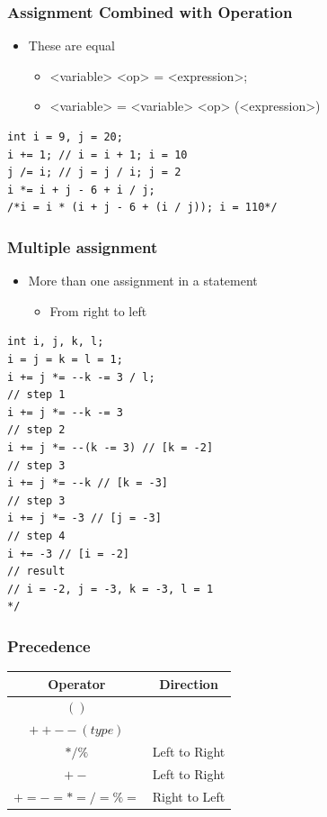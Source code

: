 \documentclass{../c-lecture}
\begin{document}
\begin{frame}[fragile]
  \frametitle{Assignment Combined with Operation}
  \begin{itemize}
    \item These are equal
    \begin{itemize}
      \item <variable> <op> = <expression>;
      \item
        <variable> = <variable> <op> (<expression>)
    \end{itemize}
  \end{itemize}
  \begin{verbatim}
int i = 9, j = 20;
i += 1; // i = i + 1; i = 10
j /= i; // j = j / i; j = 2
i *= i + j - 6 + i / j;
/*i = i * (i + j - 6 + (i / j)); i = 110*/
  \end{verbatim}
\end{frame}

\begin{frame}[fragile]
  \frametitle{Multiple assignment}
  \begin{itemize}
    \item More than one assignment in a statement
    \begin{itemize}
      \item From right to left
    \end{itemize}
  \end{itemize}
  \begin{verbatim}
int i, j, k, l;
i = j = k = l = 1;
i += j *= --k -= 3 / l;
// step 1
i += j *= --k -= 3
// step 2
i += j *= --(k -= 3) // [k = -2]
// step 3
i += j *= --k // [k = -3]
// step 3
i += j *= -3 // [j = -3]
// step 4
i += -3 // [i = -2]
// result
// i = -2, j = -3, k = -3, l = 1
*/
  \end{verbatim}
\end{frame}

\begin{frame}
  \frametitle{Precedence}
  \begin{table}
  \begin{tabular}{cc}
    \toprule

    Operator &
    Direction \\

    \midrule

    $( )$&
    \\

    \midrule

    $++ -- (type)$ &
    \\

    \midrule

    $* / \%$ &
    Left to Right \\

    \midrule

    $+ -$ &
    Left to Right \\

    \midrule

    $+= -= *= /= \%=$ &
    Right to Left \\

    \bottomrule
  \end{tabular}
  \end{table}
\end{frame}
\end{document}
